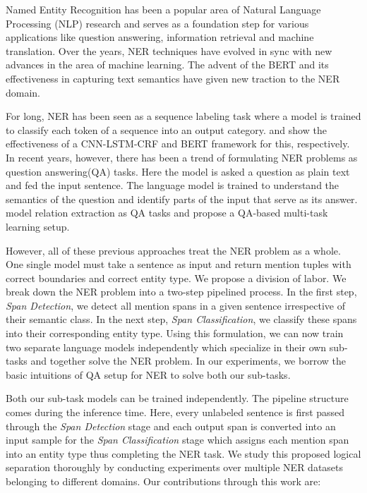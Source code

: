 
Named Entity Recognition has been a popular area of Natural Language Processing (NLP) research and serves as a foundation step for various applications like question answering, information retrieval and machine translation. Over the years, NER techniques have evolved in sync with new advances in the area of machine learning. The advent of the BERT \cite{devlin2018bert} and its effectiveness in capturing text semantics have given new traction to the NER domain. 

For long, NER has been seen as a sequence labeling task where a model is trained to classify each token of a sequence into an output category. \cite{ma2016end} and \cite{devlin2018bert} show the effectiveness of a CNN-LSTM-CRF and BERT framework for this, respectively. In recent years, however, there has been a trend of formulating NER problems as question answering(QA) tasks. Here the model is asked a question as plain text and fed the input sentence. The language model is trained to understand the semantics of the question and identify parts of the input that serve as its answer. \cite{li2019entity, levy2017zero} model relation extraction as QA tasks and \cite{mccann2018natural} propose a QA-based multi-task learning setup.

However, all of these previous approaches treat the NER problem as a whole. One single model must take a sentence as input and return mention tuples with correct boundaries and correct entity type. We propose a division of labor. We break down the NER problem into a two-step pipelined process. In the first step, \textit{Span Detection}, we detect all mention spans in a given sentence irrespective of their semantic class. In the next step, \textit{Span Classification}, we classify these spans into their corresponding entity type. Using this formulation, we can now train two separate language models independently which specialize in their own sub-tasks and together solve the NER problem. In our experiments, we borrow the basic intuitions of QA setup for NER to solve both our sub-tasks.

Both our sub-task models can be trained independently. The pipeline structure comes during the inference time. Here, every unlabeled sentence is first passed through the \textit{Span Detection} stage and each output span is converted into an input sample for the \textit{Span Classification} stage which assigns each mention span into an entity type thus completing the NER task. We study this proposed logical separation thoroughly by conducting experiments over multiple NER datasets belonging to different domains. Our contributions through this work are:

